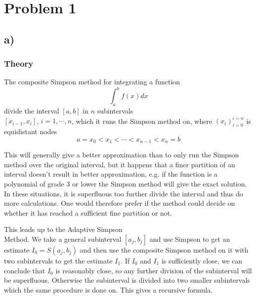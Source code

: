 \documentclass[12pt, a4paper,usenames,dvipsnames]{article}
\begin{document}
\section*{Problem 1}
\subsection*{a)}
\subsubsection*{Theory}
The composite Simpson method for integrating a function 
\[\int_a^bf(x)dx\] 
divide the interval \([a,b]\) in \(n\) subintervals\\ \([x_{i-1},x_i]\), \(i=1,\cdots,n\), which it runs the Simpson method on, where \((x_i)_{i=0}^{i=n}\) is equidistant nodes \[a=x_0<x_1<\cdots<x_{n-1}<x_n=b\]

This will generally give a better approximation than to only run the Simpson method over the original interval, but it happens that a finer partition of an interval doesn't result in better approximation, e.g. if the function is a polynomial of grade 3 or lower the Simpson method will give the exact solution. In these situations, it is superfluous too further divide the interval and thus do more calculations. One would therefore prefer if the method could decide on whether it has reached a sufficient fine partition or not.

This leads up to the Adaptive Simpson \\Method. We take a general subinterval \([a_j,b_j]\) and use Simpson to get an estimate \(I_0=S(a_j,b_j)\) and then use the composite Simpson method on it with two subintervals to get the estimate \(I_1\). If \(I_0\) and \(I_1\) is sufficiently close, we can conclude that \(I_0\) is reasonably close, so any further division of the subinterval will be superfluous. Otherwise the subinterval is divided into two smaller subintervals which the same procedure is done on. This gives a recursive formula. 
\end{document}
